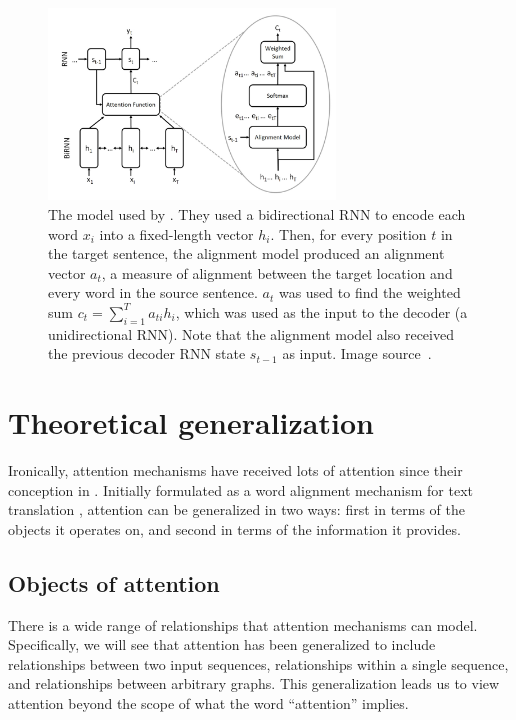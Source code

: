 \documentclass{article}
\begin{document}
\begin{figure}
    \centering
    \includegraphics[width=3in]{figures/rnn_search.png}
    \caption{The model used by \protect\cite{joint_align_translate}. They used a bidirectional RNN to encode each word $x_i$ into a fixed-length vector $h_i$. Then, for every position $t$ in the target sentence, the alignment model produced an alignment vector $a_t$, a measure of alignment between the target location and every word in the source sentence. $a_t$ was used to find the weighted sum $c_t=\sum_{i=1}^Ta_{ti}h_i$, which was used as the input to the decoder (a unidirectional RNN). Note that the alignment model also received the previous decoder RNN state $s_{t-1}$ as input. Image source~\protect\cite{attention_please}.}\label{figure:rnn_search}
\end{figure}

\section{Theoretical generalization}

Ironically, attention mechanisms have received lots of attention since their conception in \citeyear{joint_align_translate}. Initially formulated as a word alignment mechanism for text translation \cite{joint_align_translate}, attention can be generalized in two ways: first in terms of the objects it operates on, and second in terms of the information it provides.



\subsection{Objects of attention}

There is a wide range of relationships that attention mechanisms can model. Specifically, we will see that attention has been generalized to include relationships between two input sequences, relationships within a single sequence, and relationships between arbitrary graphs. This generalization leads us to view attention beyond the scope of what the word ``attention'' implies.
\end{document}
